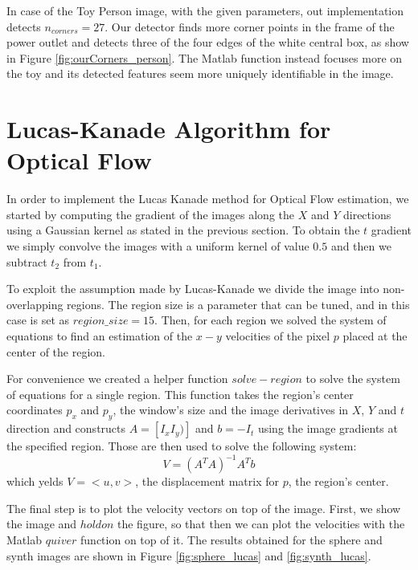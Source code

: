 \documentclass[11pt]{article}
\begin{document}
In case of the Toy Person image, with the given parameters, out implementation
detects $n_{corners} = 27$. Our detector finds more corner points in the frame
of the power outlet and detects three of the four edges of the white central
box, as show in Figure \ref{fig:ourCorners_person}. The Matlab function
instead focuses more on the toy and its detected features seem more uniquely
identifiable in the image.

\section{Lucas-Kanade Algorithm for Optical Flow}
In order to implement the Lucas Kanade method for Optical Flow estimation, we started by
computing the gradient of the images along the $X$ and $Y$ directions using a Gaussian
kernel as stated in the previous section.
To obtain the $t$ gradient we simply convolve the images with a uniform kernel
of value $0.5$ and then we subtract $t_2$ from $t_1$.

To exploit the assumption made by Lucas-Kanade we divide the image into
non-overlapping regions. The region size is a parameter that can be tuned, and
in this case is set as $region\_size= 15$. Then, for each region we solved the
system of equations to find an estimation of the $x-y$ velocities of the
pixel $p$ placed at the center of the region.

For convenience we created a helper function $solve-region$ to solve the system
of equations for a single region. This function takes the region's center
coordinates $p_x$ and $p_y$, the window's size and the image derivatives in $X$,
$Y$ and $t$ direction and constructs $A = [I_x I_y)]$ and $b = -I_t$ using the
image gradients at the specified region. Those are then used to solve the
following system:
$$V = (A^TA)^{-1}A^Tb$$
which yelds $V = <u, v>$, the displacement matrix for $p$, the region's center.

The final step is to plot the velocity vectors on top of the image. First, we show the image and $hold on$ the figure, so that then we can plot the velocities with the Matlab $quiver$ function on top of it. The results obtained for the sphere and synth images are shown in Figure \ref{fig:sphere_lucas} and \ref{fig:synth_lucas}.
\end{document}
